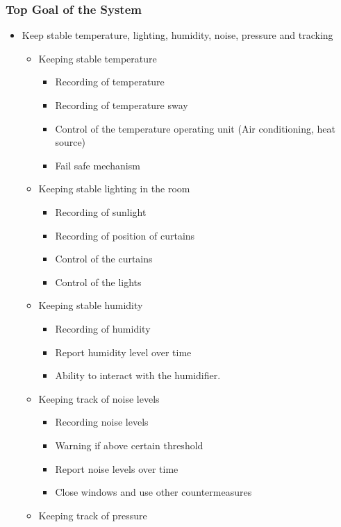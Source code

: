 \documentclass[../document]{subfiles}
\begin{document}
\subsubsection{Top Goal of the System}
\begin{itemize}
	\item
	Keep stable temperature, lighting, humidity, noise, pressure and tracking
	\begin{itemize}
		\item
		Keeping stable temperature
		\begin{itemize}
			\item
			Recording of temperature
			\item
			Recording of temperature sway
			\item
			Control of the temperature operating unit (Air conditioning, heat source)
			\item
			Fail safe mechanism
		\end{itemize}
		\item
		Keeping stable lighting in the room
		\begin{itemize}
			\item
			Recording of sunlight
			\item
			Recording of position of curtains
			\item
			Control of the curtains
			\item
			Control of the lights
		\end{itemize}
		\item
		Keeping stable humidity
		\begin{itemize}
			\item
			Recording of humidity
			\item
			Report humidity level over time
			\item
			Ability to interact with the humidifier.
		\end{itemize}
		\item
		Keeping track of noise levels
		\begin{itemize}
			\item
			Recording noise levels
			\item
			Warning if above certain threshold 
			\item
			Report noise levels over time 
			\item
			Close windows and use other countermeasures
		\end{itemize}
		\item
		Keeping track of pressure
		\begin{itemize}

\end{itemize}
\end{itemize}
\end{itemize}
\end{document}
